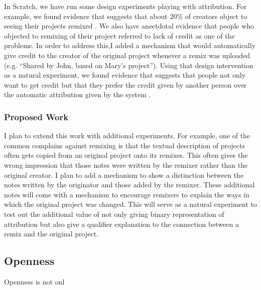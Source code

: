 In Scratch, we have run some design experiments playing with attribution. 
For example, we found evidence that suggests that about 20\% of creators object to seeing their projects remixed \citep{hill_responses_2010}.
We also have anectdotal evidence that people who objected to remixing of their project referred to lack of credit as one of the problems.
In order to address this,I added a mechanism that would automatically give credit to the creator of the original project whenever a remix was uploaded (e.g. ``Shared by John, based on Mary's project'').
Using that design intervention as a natural experiment, we found evidence that suggests that people not only want to get credit but that they prefer the credit given by another person over the automatic attribution given by the system \cite{monroy-hernandez_computers_2011}. 

\subsubsection{Proposed Work}
I plan to extend this work with additional experiments.
For example, one of the common complains against remixing is that the textual description of projects often gets copied from an original project onto its remixes.
This often gives the wrong impression that those notes were written by the remixer rather than the original creator.
I plan to add a mechanism to show a distinction between the notes written by the originator and those added by the remixer.
These additional notes will come with a mechanism to encourage remixers to explain the ways in which the original project was changed.
This will serve as a natural experiment to test out the additional value of not only giving binary representation of attribution but also give a qualifier explanation to the connection between a remix and the original project.


\subsection{Openness}
Openness is not onl
% 

